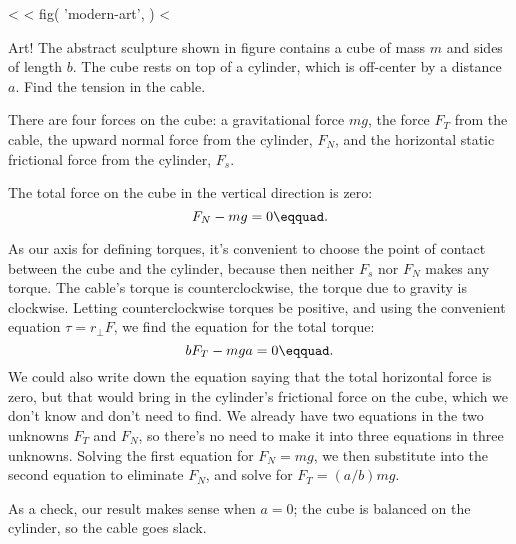 <%
<%
  fig(
    'modern-art',
  )
<%
\begin{eg}{Art!}\label{eg:modern-art}
\egquestion The abstract sculpture shown in figure 
contains a cube of mass $m$ and sides of length $b$.
The cube rests on top of a cylinder, which is off-center by a distance $a$.
Find the tension in the cable.

\eganswer There are four forces on the cube:
a gravitational force $mg$, 
the force $F_T$ from the cable, the upward normal
force from the cylinder, $F_N$, and the horizontal static frictional force
from the cylinder, $F_s$.

The total force on the cube in the vertical direction is zero:
\begin{equation*}
  F_N-mg = 0\eqquad.
\end{equation*}

As our axis for defining torques, it's convenient to choose the point
of contact between the cube and the cylinder, because then neither
$F_s$ nor $F_N$ makes any torque. The  cable's torque is counterclockwise,
the torque due to gravity is clockwise.
 Letting counterclockwise torques be
positive, and using the convenient equation $\tau=r_\perp F$, we find
the equation for the total torque:
\begin{equation*}
  b F_T - mga = 0\eqquad.
\end{equation*}
We could also write down the equation saying that the total horizontal
force is zero, but that would bring in the cylinder's frictional force
on the cube, which we don't know and don't need to find. We already have
two equations in the two unknowns $F_T$ and $F_N$, so there's no need
to make it into three equations in three unknowns.
Solving the first
equation for $F_N=mg$, we then substitute into the second equation
to eliminate $F_N$, and solve for $F_T=(a/b)mg$.

As a check, our result makes sense when $a=0$; the cube is balanced on the
cylinder, so the cable goes slack.
\end{eg}

